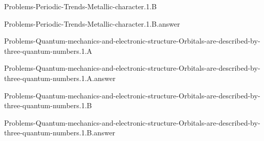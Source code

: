 \documentclass[main.tex]{subfiles}
\newcommand\chapterlabel{}
\begin{document}
\renewcommand\chapterlabel{Ch-radiation}
\begin{question}[ID=\the\value{numA}]
{Problems-Periodic-Trends-Metallic-character.1.B}
\end{question}
   \begin{Form}
   \TextField[multiline,backgroundcolor=gray!20,borderwidth=0,width=0.43\textwidth  ,height=115pt, name=\the\value{numA}]  { }\end{Form}
\begin{solution}
{Problems-Periodic-Trends-Metallic-character.1.B.answer}
\hspace{0.1cm}
\end{solution}


\renewcommand\chapterlabel{Ch-radiation}
\begin{question}[ID=\the\value{numA}]
{Problems-Quantum-mechanics-and-electronic-structure-Orbitals-are-described-by-three-quantum-numbers.1.A}
\end{question}
   \begin{Form}
   \TextField[multiline,backgroundcolor=gray!20,borderwidth=0,width=0.43\textwidth  ,height=115pt, name=\the\value{numA}]  { }\end{Form}
\begin{solution}
{Problems-Quantum-mechanics-and-electronic-structure-Orbitals-are-described-by-three-quantum-numbers.1.A.answer}
\hspace{0.1cm}
\end{solution}


\renewcommand\chapterlabel{Ch-radiation}
\begin{question}[ID=\the\value{numA}]
{Problems-Quantum-mechanics-and-electronic-structure-Orbitals-are-described-by-three-quantum-numbers.1.B}
\end{question}
   \begin{Form}
   \TextField[multiline,backgroundcolor=gray!20,borderwidth=0,width=0.43\textwidth  ,height=115pt, name=\the\value{numA}]  { }\end{Form}
\begin{solution}
{Problems-Quantum-mechanics-and-electronic-structure-Orbitals-are-described-by-three-quantum-numbers.1.B.answer}
\hspace{0.1cm}
\end{solution}
\end{document}
